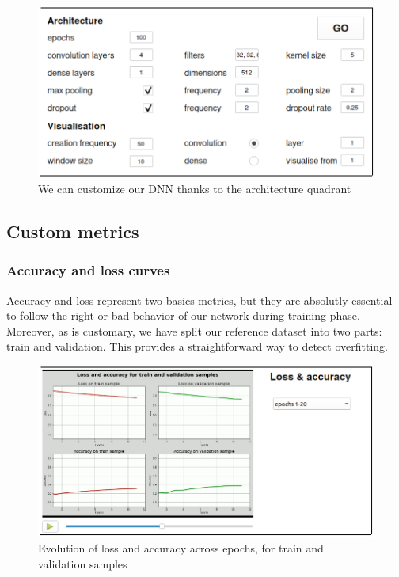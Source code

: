 \begin{figure}[H]
    \centering
    \includegraphics[scale=0.5]{images/weights-grads-viewer/Quadrant_architecture.png}
    \caption{We can customize our DNN thanks to the architecture quadrant}
\end{figure}


\subsection{Custom metrics}

\subsubsection{Accuracy and loss curves}

Accuracy and loss represent two basics metrics, but they are absolutly essential to follow the right or bad behavior of our network during training phase. Moreover, as is customary, we have split our reference dataset into two parts: train and validation. This provides a straightforward way to detect overfitting.   

\begin{figure}[H]
    \centering
    \includegraphics[scale=0.6]{images/weights-grads-viewer/Quadrant_loss.png}
    \caption{Evolution of loss and accuracy across epochs, for train and validation samples}
\end{figure}


